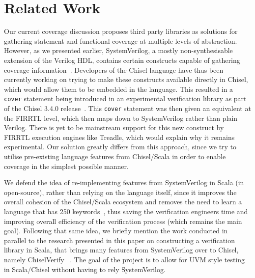 \documentclass[runningheads]{llncs}
\newcommand{\martin}[1]{{\color{blue} Martin: #1}}
\begin{document}
\section{Related Work}


Our current coverage discussion proposes third party libraries  as solutions for gathering statement and functional coverage at multiple levels of abstraction. However, as we presented earlier, SystemVerilog, a mostly non-synthesisable extension of the Verilog HDL, contains certain constructs capable of gathering coverage information~\cite{spear2008systemverilog}. Developers of the Chisel language have thus been currently working on trying to make these constructs available directly in Chisel, which would allow them to be embedded in the language. This resulted in a \texttt{cover} statement being introduced in an experimental verification library as part of the Chisel 3.4.0 release~\cite{chisel3.4release_notes}. This \texttt{cover} statement was then given an equivalent at the FIRRTL level, which then maps down to SystemVerilog rather than plain Verilog. There is yet to be mainstream support for this new construct by FIRRTL execution engines like Treadle, which would explain why it remains experimental. Our solution greatly differs from this approach, since we try to utilise pre-existing language features from Chisel/Scala in order to enable coverage in the simplest possible manner. 

We defend the idea of re-implementing features from SystemVerilog in Scala (in open-source), rather than relying on the language itself, since it improves the overall cohesion of the Chisel/Scala ecosystem and removes the need to learn a language that has 250 keywords~\cite{SystemVerilog}, thus saving the verification engineers time and improving overall efficiency of the verification process (which remains the main goal). Following that same idea, we briefly mention the work conducted in parallel to the research presented in this paper on constructing a verification library in Scala, that brings many features from SystemVerilog over to Chisel, namely ChiselVerify~\cite{blind} %
.
The goal of the project is to allow for UVM style testing in Scala/Chisel without having to rely SystemVerilog. 
\end{document}
